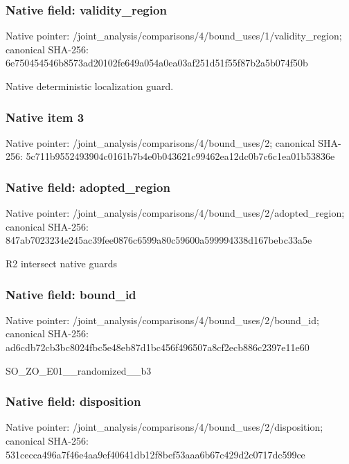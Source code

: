 \documentclass[10pt,a4paper]{article}
\begin{document}
\subsubsection{Native field: validity\_\allowbreak{}region}
Native pointer: /joint\_\allowbreak{}analysis/comparisons/4/bound\_\allowbreak{}uses/1/validity\_\allowbreak{}region; canonical SHA-256: 6e750454546b8573ad20102fe649a054a0ea03af251d51f55f87b2a5b074f50b

\begingroup\raggedright\sloppy Native deterministic localization guard.\par\endgroup

\subsubsection{Native item 3}
Native pointer: /joint\_\allowbreak{}analysis/comparisons/4/bound\_\allowbreak{}uses/2; canonical SHA-256: 5c711b9552493904c0161b7b4e0b043621c99462ea12dc0b7c6c1ea01b53836e

\subsubsection{Native field: adopted\_\allowbreak{}region}
Native pointer: /joint\_\allowbreak{}analysis/comparisons/4/bound\_\allowbreak{}uses/2/adopted\_\allowbreak{}region; canonical SHA-256: 847ab7023234e245ac39fee0876c6599a80c59600a599994338d167bebc33a5e

\begingroup\raggedright\sloppy R2 intersect native guards\par\endgroup

\subsubsection{Native field: bound\_\allowbreak{}id}
Native pointer: /joint\_\allowbreak{}analysis/comparisons/4/bound\_\allowbreak{}uses/2/bound\_\allowbreak{}id; canonical SHA-256: ad6cdb72cb3bc8024fbc5e48eb87d1bc456f496507a8cf2ecb886c2397e11e60

\begingroup\raggedright\sloppy SO\_\allowbreak{}ZO\_\allowbreak{}E01\_\allowbreak{}\_\allowbreak{}randomized\_\allowbreak{}\_\allowbreak{}b3\par\endgroup

\subsubsection{Native field: disposition}
Native pointer: /joint\_\allowbreak{}analysis/comparisons/4/bound\_\allowbreak{}uses/2/disposition; canonical SHA-256: 531cecca496a7f46e4aa9ef40641db12f8bef53aaa6b67c429d2c0717dc599ce
\end{document}
